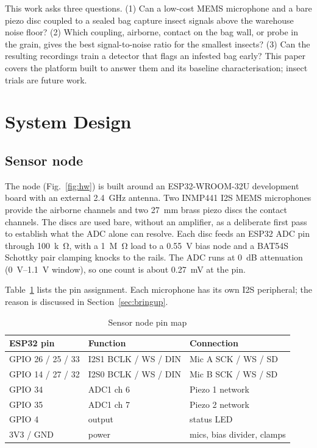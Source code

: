 \documentclass[conference]{IEEEtran}
\begin{document}
This work asks three questions. (1) Can a low-cost MEMS microphone and a bare piezo disc coupled to a sealed bag capture insect signals above the warehouse noise floor? (2) Which coupling, airborne, contact on the bag wall, or probe in the grain, gives the best signal-to-noise ratio for the smallest insects? (3) Can the resulting recordings train a detector that flags an infested bag early? This paper covers the platform built to answer them and its baseline characterisation; insect trials are future work.

\section{System Design}

\subsection{Sensor node}
The node (Fig.~\ref{fig:hw}) is built around an ESP32-WROOM-32U development board with an external \SI{2.4}{GHz} antenna. Two INMP441 I2S MEMS microphones \cite{inmp441} provide the airborne channels and two \SI{27}{mm} brass piezo discs the contact channels. The discs are used bare, without an amplifier, as a deliberate first pass to establish what the ADC alone can resolve. Each disc feeds an ESP32 ADC pin through \SI{100}{k\ohm}, with a \SI{1}{M\ohm} load to a \SI{0.55}{V} bias node and a BAT54S Schottky pair clamping knocks to the rails. The ADC runs at \SI{0}{dB} attenuation (\SIrange{0}{1.1}{V} window), so one count is about \SI{0.27}{mV} at the pin.

Table~\ref{tab:pins} lists the pin assignment. Each microphone has its own I2S peripheral; the reason is discussed in Section~\ref{sec:bringup}.

\begin{table}[t]
\caption{Sensor node pin map}
\label{tab:pins}
\centering
\begin{tabular}{lll}
\toprule
ESP32 pin & Function & Connection \\
\midrule
GPIO 26 / 25 / 33 & I2S1 BCLK / WS / DIN & Mic A SCK / WS / SD \\
GPIO 14 / 27 / 32 & I2S0 BCLK / WS / DIN & Mic B SCK / WS / SD \\
GPIO 34 & ADC1 ch 6 & Piezo 1 network \\
GPIO 35 & ADC1 ch 7 & Piezo 2 network \\
GPIO 4 & output & status LED \\
3V3 / GND & power & mics, bias divider, clamps \\
\bottomrule
\end{tabular}
\end{table}
\end{document}
